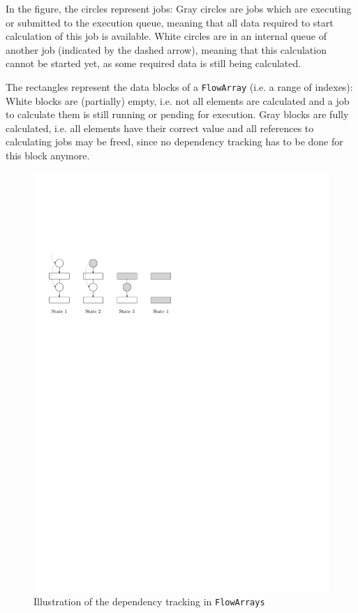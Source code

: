 \documentclass[runningheads,a4paper,fleqn]{llncs}
\begin{document}
In the figure, the circles represent jobs: Gray circles are jobs which 
are executing or submitted to the execution queue, meaning that all 
data required to start calculation of this job is available. White
circles are in an internal queue of another job (indicated by the dashed
arrow), meaning that this calculation cannot be started yet, as some
required data is still being calculated.

The rectangles represent the data blocks of a \texttt{FlowArray} (i.e. a range
of indexes): White blocks are (partially) empty, i.e. not all elements
are calculated and a job to calculate them is still running or pending
for execution. Gray blocks are fully calculated, i.e. all elements
have their correct value and all references to calculating jobs may be
freed, since no dependency tracking has to be done for this block
anymore.

\begin{figure}
  \centering
  \includegraphics{dependency-tracking}
  \caption{Illustration of the dependency tracking in \texttt{FlowArrays}}
  \label{fig:dep-track}
\end{figure}
\end{document}

